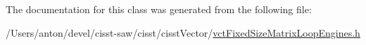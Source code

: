 The documentation for this class was generated from the following file\+:\begin{DoxyCompactItemize}
\item 
/\+Users/anton/devel/cisst-\/saw/cisst/cisst\+Vector/\hyperlink{vct_fixed_size_matrix_loop_engines_8h}{vct\+Fixed\+Size\+Matrix\+Loop\+Engines.\+h}\end{DoxyCompactItemize}
